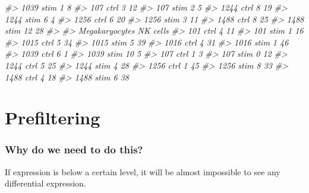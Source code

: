 \documentclass[
]{book}
\newenvironment{Shaded}{\begin{snugshade}}{\end{snugshade}}
\newcommand{\CommentTok}[1]{\textcolor[rgb]{0.56,0.35,0.01}{\textit{#1}}}
\begin{document}
\begin{Shaded}
\begin{Highlighting}[]
\CommentTok{\#\textgreater{}   1039 stim               1                 8}
\CommentTok{\#\textgreater{}   107 ctrl                3                12}
\CommentTok{\#\textgreater{}   107 stim                2                 5}
\CommentTok{\#\textgreater{}   1244 ctrl               8                19}
\CommentTok{\#\textgreater{}   1244 stim               6                 4}
\CommentTok{\#\textgreater{}   1256 ctrl               6                20}
\CommentTok{\#\textgreater{}   1256 stim               3                11}
\CommentTok{\#\textgreater{}   1488 ctrl               8                25}
\CommentTok{\#\textgreater{}   1488 stim              12                28}
\CommentTok{\#\textgreater{}            }
\CommentTok{\#\textgreater{}             Megakaryocytes NK cells}
\CommentTok{\#\textgreater{}   101 ctrl               4       11}
\CommentTok{\#\textgreater{}   101 stim               1       16}
\CommentTok{\#\textgreater{}   1015 ctrl              5       34}
\CommentTok{\#\textgreater{}   1015 stim              5       39}
\CommentTok{\#\textgreater{}   1016 ctrl              4       31}
\CommentTok{\#\textgreater{}   1016 stim              1       46}
\CommentTok{\#\textgreater{}   1039 ctrl              6        1}
\CommentTok{\#\textgreater{}   1039 stim             10        5}
\CommentTok{\#\textgreater{}   107 ctrl               1        3}
\CommentTok{\#\textgreater{}   107 stim               0       12}
\CommentTok{\#\textgreater{}   1244 ctrl              5       25}
\CommentTok{\#\textgreater{}   1244 stim              4       28}
\CommentTok{\#\textgreater{}   1256 ctrl              1       45}
\CommentTok{\#\textgreater{}   1256 stim              8       33}
\CommentTok{\#\textgreater{}   1488 ctrl              4       18}
\CommentTok{\#\textgreater{}   1488 stim              6       38}
\end{Highlighting}
\end{Shaded}

\section{Prefiltering}\label{prefiltering}

\subsubsection*{Why do we need to do this?}\label{why-do-we-need-to-do-this-7}

If expression is below a certain level, it will be almost impossible to see any differential expression.
\end{document}
